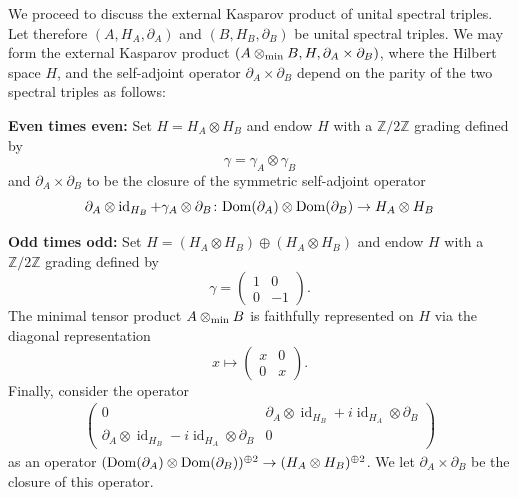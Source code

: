 \documentclass[11pt, a4paper, oneside, final, reqno]{amsart}
\newcommand{\bbZ}{\mathbb{Z}}
\newcommand{\id}{\operatorname{id}}
\theoremstyle{definition}
\theoremstyle{plain}
\theoremstyle{remark}
\numberwithin{equation}{section}
\begin{document}
We proceed to discuss the external Kasparov product of unital spectral triples. Let therefore
$(A,H_A,\partial_A)$ and $(B,H_B,\partial_B)$ be unital spectral triples. We may form the external Kasparov product $(A \otimes_{\rm min} B, H, \partial_A \times \partial_B)$, where the Hilbert space $H$, and the self-adjoint operator $\partial_A \times \partial_B$ depend on the parity of the two spectral triples as follows:

\medskip \textbf{Even times even:} Set $H = H_A \otimes H_B$ and endow $H$ with a $\bbZ/2\bbZ$ grading defined by
\begin{equation*}
    \gamma = \gamma_A \otimes \gamma_B
\end{equation*}
and  $\partial_A \times \partial_B$ to be the closure of the symmetric self-adjoint operator
\begin{equation*}
     \partial_A \otimes \id_{H_B} + \gamma_A \otimes \partial_B \colon {\rm Dom}(\partial_A) \otimes {\rm Dom}(\partial_B) \to H_A \otimes H_B
\end{equation*}

\textbf{Odd times odd:} Set $H = (H_A \otimes H_B) \oplus (H_A \otimes H_B)$ and endow $H$ with a $\bbZ/2\bbZ$ grading defined by
\begin{equation*}
    \gamma =
    \begin{pmatrix}
        1 & 0 \\
        0 & -1
    \end{pmatrix}.
\end{equation*}
The minimal tensor product $A \otimes_{\rm min} B$ is faithfully represented on $H$ via the diagonal representation
\begin{equation*}
    x \mapsto
    \begin{pmatrix}
        x & 0 \\
        0 & x
    \end{pmatrix}.
\end{equation*}
Finally, consider the operator
\begin{equation*}
\begin{split}
    \begin{pmatrix}
        0 & \partial_A \otimes \id_{H_B} + i\id_{H_A} \otimes \partial_B \\
        \partial_A \otimes \id_{H_B} - i\id_{H_A} \otimes \partial_B & 0
    \end{pmatrix}
\end{split}
\end{equation*}
as an operator $({\rm Dom}(\partial_A) \otimes {\rm Dom}(\partial_B))^{\oplus 2} \to (H_A \otimes H_B)^{\oplus 2}$. We let $\partial_A \times \partial_B$ be the closure of this operator.
\end{document}
